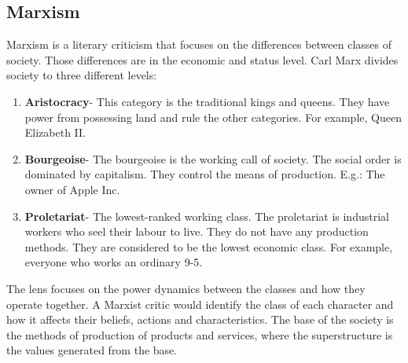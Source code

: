 \documentclass[11pt, twocolumn]{article}
\begin{document}
\begin{twocolumn}
\pagebreak
\section{Marxism}
Marxism is a literary criticism that focuses on the differences between classes of society.
Those differences are in the economic and status level. Carl Marx divides society to three different levels:
\begin{enumerate}
        \item \textbf{Aristocracy}- This category is the traditional kings and queens. They have power from possessing land and rule the other categories. For example, Queen Elizabeth II.
        \item \textbf{Bourgeoise}- The bourgeoise is the working call of society. The social order is dominated by capitalism. They control the means of production. E.g.: The owner of Apple Inc.
        \item \textbf{Proletariat}- The lowest-ranked working class. The proletariat is industrial workers who seel their labour to live. They do not have any production methods. They are considered to be the lowest economic class. For example, everyone who works an ordinary 9-5.
\end{enumerate}
The lens focuses on the power dynamics between the classes and how they operate together.
A Marxist critic would identify the class of each character and how it affects their beliefs, actions and characteristics.
The base of the society is the methods of production of products and services, where the superstructure is the values generated from the base.


\end{twocolumn}
\end{document}
